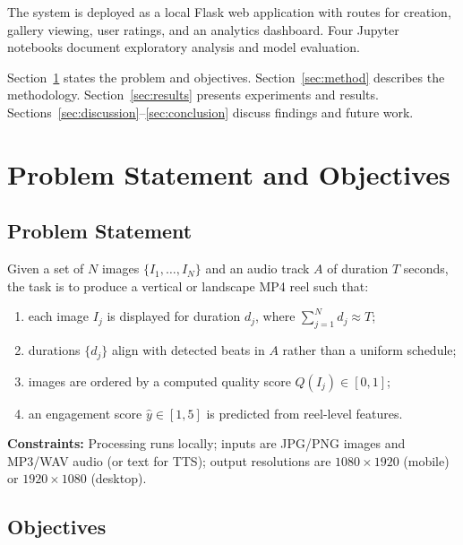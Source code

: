 \documentclass{article}
\begin{document}
The system is deployed as a local Flask web application with routes for creation, gallery viewing, user ratings, and an analytics dashboard.
Four Jupyter notebooks document exploratory analysis and model evaluation.

Section~\ref{sec:problem} states the problem and objectives.
Section~\ref{sec:method} describes the methodology.
Section~\ref{sec:results} presents experiments and results.
Sections~\ref{sec:discussion}--\ref{sec:conclusion} discuss findings and future work.

\section{Problem Statement and Objectives}
\label{sec:problem}

\subsection{Problem Statement}

Given a set of $N$ images $\{I_1, \ldots, I_N\}$ and an audio track $A$ of duration $T$ seconds, the task is to produce a vertical or landscape MP4 reel such that:
\begin{enumerate}[noitemsep]
    \item each image $I_j$ is displayed for duration $d_j$, where $\sum_{j=1}^{N} d_j \approx T$;
    \item durations $\{d_j\}$ align with detected beats in $A$ rather than a uniform schedule;
    \item images are ordered by a computed quality score $Q(I_j) \in [0,1]$;
    \item an engagement score $\hat{y} \in [1,5]$ is predicted from reel-level features.
\end{enumerate}

\textbf{Constraints:} Processing runs locally; inputs are JPG/PNG images and MP3/WAV audio (or text for TTS); output resolutions are $1080{\times}1920$ (mobile) or $1920{\times}1080$ (desktop).

\subsection{Objectives}
\end{document}
